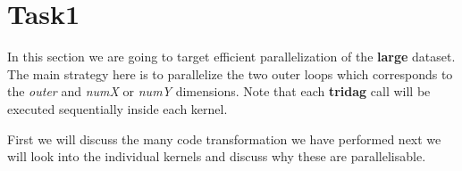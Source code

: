 \section{Task1}
In this section we are going to target efficient parallelization of the
\textbf{large} dataset. The main strategy here is to parallelize the two outer
loops which corresponds to the \emph{outer} and \emph{numX} or \emph{numY}
dimensions. Note that each \textbf{tridag} call will be executed sequentially
inside each kernel.

First we will discuss the many code transformation we have performed
next we will look into the individual kernels and discuss why these
are parallelisable.